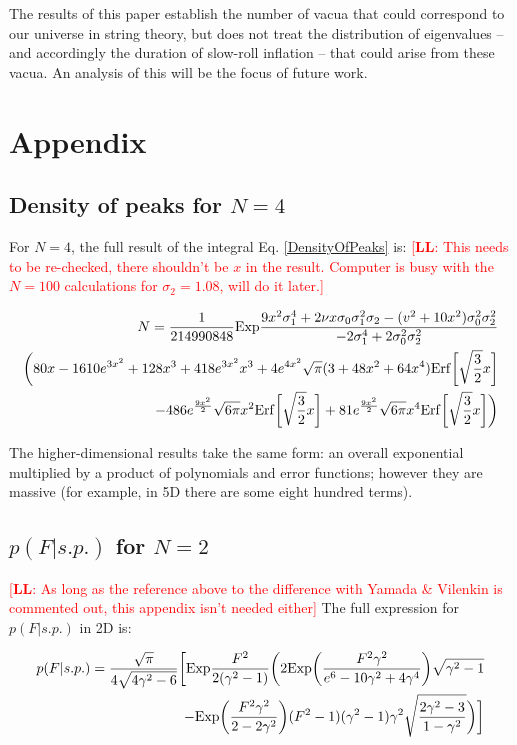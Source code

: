\documentclass[12pt]{article}
\newcommand{\lfl}[1]{\textcolor{red}{[{\bf LL}: #1]}}
\begin{document}
The results of this paper establish the number of vacua that could correspond to our universe in string theory, but does not treat the distribution of eigenvalues -- and accordingly the duration of slow-roll inflation -- that could arise from these vacua. An analysis of this will be the focus of future work.

\section{Appendix}
\subsection{Density of peaks for $N=4$} 
For $N=4$, the full result of the integral Eq. \ref{DensityOfPeaks} is: \lfl{This needs to be re-checked, there shouldn't be $x$ in the result. Computer is busy with the $N=100$ calculations for $\sigma_2=1.08$, will do it later.}

\begin{equation}
\begin{split}
N = \frac{1}{214990848} \mathrm{Exp}\frac{9x^2\sigma_1^4 + 2\nu x \sigma_0 \sigma_1^2 \sigma_2 - (v^2+10x^2)\sigma_0^2\sigma_2^2}{-2\sigma_1^4+2\sigma_0^2\sigma_2^2}\\\bigg{(}80x - 1610e^{3x^2}+128x^3+418e^{3x^2}x^3+4e^{4x^2}\sqrt{\pi}(3+48x^2+64x^4)\mathrm{Erf}\bigg{[}\sqrt{\frac{3}{2}}x\bigg{]}\\
-486e^{\frac{9x^2}{2}}\sqrt{6\pi}x^2\mathrm{Erf}\bigg{[}\sqrt{\frac{3}{2}}x\bigg{]}+81e^{\frac{9x^2}{2}}\sqrt{6\pi}x^4\mathrm{Erf}\bigg{[}\sqrt{\frac{3}{2}}x\bigg{]}\bigg{)}
\end{split}
\end{equation}

The higher-dimensional results take the same form: an overall exponential multiplied by a product of polynomials and error functions; however they are massive (for example, in 5D there are some eight hundred terms).

\subsection{$p(F|s.p.)$ for $N=2$}
\lfl{As long as the reference above to the difference with Yamada \& Vilenkin is commented out, this appendix isn't needed either}
The full expression for $p(F|s.p.)$ in 2D is:

\begin{equation}
\begin{split}
p(F|s.p.)=\frac{\sqrt{\pi}}{4\sqrt{4\gamma^2-6}}\bigg{[}\mathrm{Exp}\frac{F^2}{2(\gamma^2-1)}\bigg{(}2\mathrm{Exp}\bigg{(}\frac{F^2\gamma^2}{e^6-10\gamma^2+4\gamma^4}\bigg{)}\sqrt{\gamma^2-1}\\
-\mathrm{Exp}\bigg{(}\frac{F^2\gamma^2}{2-2\gamma^2}\bigg{)}(F^2-1)(\gamma^2-1)\gamma^2\sqrt{\frac{2\gamma^2-3}{1-\gamma^2}}\bigg{)}\bigg{]}
\end{split}
\end{equation}
\end{document}
